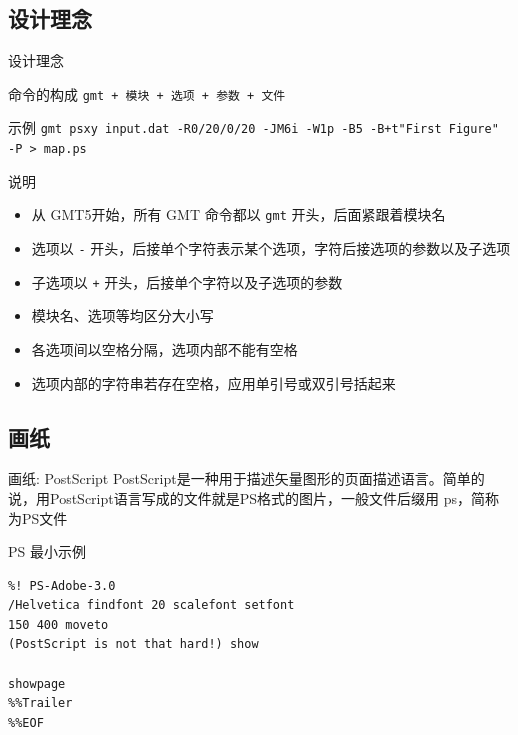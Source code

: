 \documentclass[UTF8, 11pt]{ctexbeamer}
\begin{document}
\subsection{设计理念}
\begin{frame}[fragile]{设计理念}
\begin{block}{命令的构成}
\verb|gmt + 模块 + 选项 + 参数 + 文件|
\end{block}\pause
\begin{block}{示例}
\scriptsize{\verb|gmt psxy input.dat -R0/20/0/20 -JM6i -W1p -B5 -B+t"First Figure" -P > map.ps|}
\end{block}
\begin{block}{说明}
\begin{itemize}
\item 从 GMT5开始，所有 GMT 命令都以 \verb|gmt| 开头，后面紧跟着模块名
\item 选项以 \verb|-| 开头，后接单个字符表示某个选项，字符后接选项的参数以及子选项
\item 子选项以 \verb|+| 开头，后接单个字符以及子选项的参数
\item 模块名、选项等均区分大小写
\item 各选项间以空格分隔，选项内部不能有空格
\item 选项内部的字符串若存在空格，应用单引号或双引号括起来
\end{itemize}
\end{block}
\end{frame}

\subsection{画纸}
\begin{frame}[fragile]{画纸: PostScript}
PostScript是一种用于描述矢量图形的页面描述语言。简单的说，用PostScript语言写成的文件就是PS格式的图片，一般文件后缀用 ps，简称为PS文件\pause
\begin{block}{PS 最小示例}
\small{
\begin{verbatim}
%! PS-Adobe-3.0
/Helvetica findfont 20 scalefont setfont
150 400 moveto
(PostScript is not that hard!) show

showpage
%%Trailer
%%EOF
\end{verbatim}
}
\end{block}
\end{frame}
\end{document}
